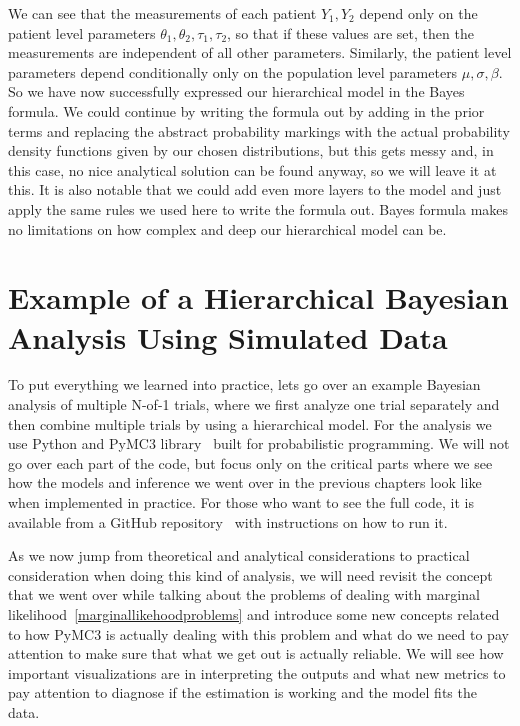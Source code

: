 \documentclass[12pt,a4paper,leqno]{report}
\theoremstyle{plain}
\theoremstyle{definition}
\theoremstyle{remark}
\begin{document}
We can see that the measurements of each patient \(Y_1, Y_2\) depend only on the patient
level parameters \(\theta_1, \theta_2, \tau_1, \tau_2\), so that if these values are set, then the
measurements are independent of all other parameters. Similarly, the patient level parameters depend conditionally only
on the population level parameters \(\mu, \sigma, \beta \). So we have now successfully
expressed our hierarchical model in the Bayes formula. We could continue by writing the
formula out by adding in the prior terms and replacing the abstract probability
markings with the actual probability density functions given by our chosen
distributions, but this gets messy and, in this case, no nice analytical solution can be
found anyway, so we will leave it at this. It is also notable that we could add even
more layers to the model and just apply the same rules we used here to write the formula
out. Bayes formula makes no limitations on how complex and deep our hierarchical model
can be.

\chapter{Example of a Hierarchical Bayesian Analysis Using Simulated
  Data}\label{example}

To put everything we learned into practice, lets go over an example Bayesian
analysis of multiple N-of-1 trials, where we first analyze one trial separately and then
combine multiple trials by using a hierarchical model. For the analysis we use Python and PyMC3 library\ \cite{pymc3} built
for probabilistic programming. We will not go over each part of the code, but focus only
on the critical parts where we see how the models and inference we went over in the
previous chapters look like when implemented in practice. For those who want to see the
full code, it is available from a GitHub repository\ \cite{github} with instructions on how
to run it.

As we now jump from theoretical and analytical considerations to practical consideration
when doing this kind of analysis, we will need revisit the concept that we went over
while talking about the problems of dealing with marginal likelihood\
\ref{marginallikehoodproblems} and introduce some new concepts related to how
PyMC3 is actually dealing with this problem and what do we need to pay attention to
make sure that what we get out is actually reliable. We will see how important
visualizations are in interpreting the outputs and what new metrics to pay attention
to diagnose if the estimation is working and the model fits the data.
\end{document}
